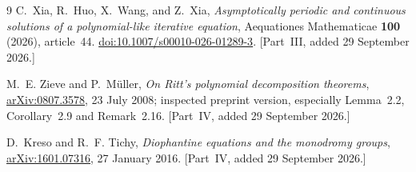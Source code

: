 \documentclass[11pt,letterpaper]{article}
\theoremstyle{definition}
\theoremstyle{remark}
\begin{document}
\begin{thebibliography}{9}
C.~Xia, R.~Huo, X.~Wang, and Z.~Xia,
\emph{Asymptotically periodic and continuous solutions of a polynomial-like
iterative equation}, Aequationes Mathematicae \textbf{100} (2026), article~44.
\href{https://doi.org/10.1007/s00010-026-01289-3}{doi:10.1007/s00010-026-01289-3}.
[Part~III, added 29 September 2026.]

M.~E. Zieve and P.~M\"uller,
\emph{On Ritt's polynomial decomposition theorems},
\href{https://arxiv.org/abs/0807.3578}{arXiv:0807.3578}, 23 July 2008;
inspected preprint version, especially Lemma~2.2, Corollary~2.9 and
Remark~2.16. [Part~IV, added 29 September 2026.]

D.~Kreso and R.~F. Tichy,
\emph{Diophantine equations and the monodromy groups},
\href{https://arxiv.org/abs/1601.07316}{arXiv:1601.07316}, 27 January 2016.
[Part~IV, added 29 September 2026.]

\end{thebibliography}
\end{document}
